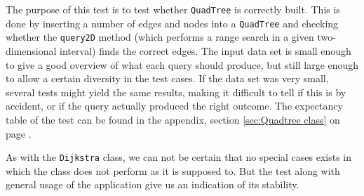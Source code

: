 The purpose of this test is to test whether \texttt{QuadTree} is correctly built. This is done by inserting a number of edges and nodes into a \texttt{QuadTree} and checking whether the \texttt{query2D} method (which performs a range search in a given two-dimensional interval) finds the correct edges. The input data set is small enough to give a good overview of what each query should produce, but still large enough to allow a certain diversity in the test cases. If the data set was very small, several tests might yield the same results, making it difficult to tell if this is by accident, or if the query actually produced the right outcome. The expectancy table of the test can be found in the appendix, section \ref{sec:Quadtree class} on page \pageref{sec:Quadtree class}.

As with the \texttt{Dijkstra} class, we can not be certain that no special cases exists in which the class does not perform as it is supposed to. But the test along with general usage of the application give us an indication of its stability.